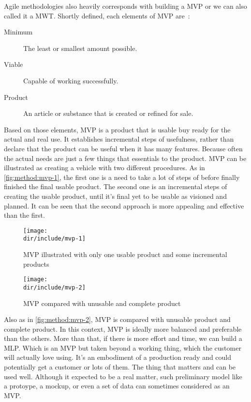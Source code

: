 Agile methodologies also heavily corresponds with building a \ac{MVP} or we can also called it a \ac{MWT}.
Shortly defined, each elements of \ac{MVP} are~\autocite{Montgomery2013MWT}:

\begin{description}
  \item[Minimum] The least or smallest amount possible.
  \item[Viable] Capable of working successfully.
  \item[Product] An article or substance that is created or refined for sale.
\end{description}

Based on those elements, \ac{MVP} is a product that is usable buy ready for the actual and real use.
It establishes incremental steps of usefulness, rather than declare that the product can be useful when it has many features.
Because often the actual needs are just a few things that essentials to the product.
\ac{MVP} can be illustrated as creating a vehicle with two different procedures.
As in \autoref{fig:method:mvp-1}, the first one is a need to take a lot of steps of before finally finished the final usable product.
The second one is an incremental steps of creating the usable product, until it's final yet to be usable as visioned and planned.
It can be seen that the second approach is more appealing and effective than the first.

\begin{figure}[!ht]
    \centering
    \texttt{[image: \\dir/include/mvp-1]}
    \caption[MVP illustrated]{MVP illustrated with only one usable product and some incremental products~\autocite{Mercury2014MVP}}
    \label{fig:method:mvp-1}
\end{figure}

\begin{figure}[!ht]
    \centering
    \texttt{[image: \\dir/include/mvp-2]}
    \caption[MVP compared]{MVP compared with unusable and complete product~\autocite{Mercury2014MVP}}
    \label{fig:method:mvp-2}
\end{figure}

Also as in \autoref{fig:method:mvp-2}, \ac{MVP} is compared with unusable product and complete product.
In this context, \ac{MVP} is ideally more balanced and preferable than the others.
More than that, if there is more effort and time, we can build a \ac{MLP}.
Which is an \ac{MVP} but taken beyond a working thing, which the customer will actually love using.
It's an embodiment of a production ready and could potentially get a customer or lots of them.
The thing that matters and can be used well.
Although it expected to be a real matter, such preliminary model like a protoype, a mockup, or even a set of data can sometimes considered as an \ac{MVP}.
